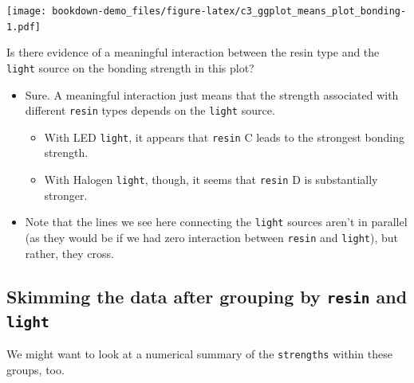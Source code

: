\documentclass[]{book}
\newenvironment{Shaded}{\begin{snugshade}}{\end{snugshade}}
\newcommand{\KeywordTok}[1]{\textcolor[rgb]{0.13,0.29,0.53}{\textbf{#1}}}
\newcommand{\StringTok}[1]{\textcolor[rgb]{0.31,0.60,0.02}{#1}}
\newcommand{\OperatorTok}[1]{\textcolor[rgb]{0.81,0.36,0.00}{\textbf{#1}}}
\newcommand{\NormalTok}[1]{#1}
\providecommand{\tightlist}{%
  \setlength{\itemsep}{0pt}\setlength{\parskip}{0pt}}
\theoremstyle{definition}
\theoremstyle{definition}
\theoremstyle{definition}
\theoremstyle{remark}
\begin{document}
\texttt{[image: bookdown-demo\_files/figure-latex/c3\_ggplot\_means\_plot\_bonding-1.pdf]}

Is there evidence of a meaningful interaction between the resin type and
the \texttt{light} source on the bonding strength in this plot?

\begin{itemize}
\tightlist
\item
  Sure. A meaningful interaction just means that the strength associated
  with different \texttt{resin} types depends on the \texttt{light}
  source.

  \begin{itemize}
  \tightlist
  \item
    With LED \texttt{light}, it appears that \texttt{resin} C leads to
    the strongest bonding strength.
  \item
    With Halogen \texttt{light}, though, it seems that \texttt{resin} D
    is substantially stronger.
  \end{itemize}
\item
  Note that the lines we see here connecting the \texttt{light} sources
  aren't in parallel (as they would be if we had zero interaction
  between \texttt{resin} and \texttt{light}), but rather, they cross.
\end{itemize}

\subsection{\texorpdfstring{Skimming the data after grouping by
\texttt{resin} and
\texttt{light}}{Skimming the data after grouping by resin and light}}\label{skimming-the-data-after-grouping-by-resin-and-light}

We might want to look at a numerical summary of the \texttt{strengths}
within these groups, too.

\begin{Shaded}
\end{Shaded}
\end{document}
